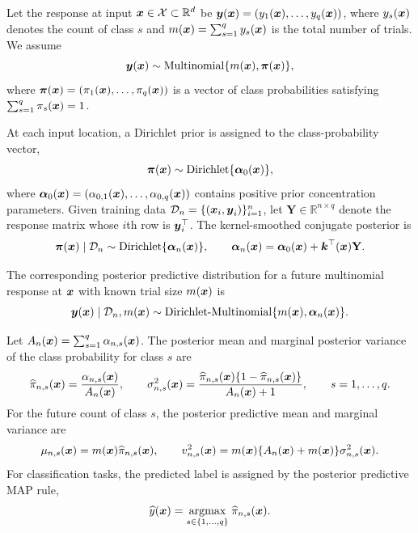 \documentclass[article, shortnames]{jss}
\renewcommand{\vec}[1]{\mbox{\boldmath ${#1}$}}
\def\argmax{\mbox{\rm argmax}}
\begin{document}
Let the response at input $\vec{x}\in\mathcal{X}\subset\mathbb{R}^d$ be 
$\vec{y}(\vec{x})=(y_1(\vec{x}),\ldots,y_q(\vec{x}))$, where $y_s(\vec{x})$ denotes the count of class $s$ and $m(\vec{x})=\sum_{s=1}^q y_s(\vec{x})$ is the total number of trials. 
We assume
\[
\vec{y}(\vec{x}) \sim \mathrm{Multinomial}\{m(\vec{x}),\vec{\pi}(\vec{x})\},
\]
where $\vec{\pi}(\vec{x})=(\pi_1(\vec{x}),\ldots,\pi_q(\vec{x}))$ is a vector of class probabilities satisfying $\sum_{s=1}^q\pi_s(\vec{x})=1$.

At each input location, a Dirichlet prior is assigned to the class-probability vector,
\[
\vec{\pi}(\vec{x})\sim\mathrm{Dirichlet}\{\vec{\alpha}_0(\vec{x})\},
\]
where $\vec{\alpha}_0(\vec{x})=(\alpha_{0,1}(\vec{x}),\ldots,\alpha_{0,q}(\vec{x}))$ contains positive prior concentration parameters. 
Given training data $\mathcal{D}_n=\{(\vec{x}_i,\vec{y}_i)\}_{i=1}^n$, let $\mathbf{Y}\in\mathbb{R}^{n\times q}$ denote the response matrix whose $i$th row is $\vec{y}_i^\top$. 
The kernel-smoothed conjugate posterior is
\begin{equation}\label{eq:DKP_model}
	\vec{\pi}(\vec{x}) \mid \mathcal{D}_n 
	\sim 
	\mathrm{Dirichlet}\{\vec{\alpha}_n(\vec{x})\},
	\qquad
	\vec{\alpha}_n(\vec{x}) 
	= \vec{\alpha}_0(\vec{x}) + \vec{k}^{\top}(\vec{x})\mathbf{Y}.
\end{equation}

The corresponding posterior predictive distribution for a future multinomial response at $\vec{x}$ with known trial size $m(\vec{x})$ is
\begin{equation}\label{eq:DKP_predictive_count}
	\vec{y}(\vec{x}) \mid \mathcal{D}_n, m(\vec{x})
	\sim
	\mathrm{Dirichlet\mbox{-}Multinomial}
	\{m(\vec{x}), \vec{\alpha}_n(\vec{x})\}.
\end{equation}

Let $A_n(\vec{x})=\sum_{s=1}^q\alpha_{n,s}(\vec{x})$. 
The posterior mean and marginal posterior variance of the class probability for class $s$ are
\[
\widehat{\pi}_{n,s}(\vec{x}) 
= \frac{\alpha_{n,s}(\vec{x})}{A_n(\vec{x})},
\qquad
\sigma^2_{n,s}(\vec{x}) 
= \frac{\widehat{\pi}_{n,s}(\vec{x})\{1-\widehat{\pi}_{n,s}(\vec{x})\}}
{A_n(\vec{x})+1},
\qquad s=1,\ldots,q.
\]
For the future count of class $s$, the posterior predictive mean and marginal variance are
\[
\mu_{n,s}(\vec{x}) 
= m(\vec{x})\widehat{\pi}_{n,s}(\vec{x}),
\qquad
v^2_{n,s}(\vec{x}) 
= m(\vec{x})\{A_n(\vec{x})+m(\vec{x})\}\sigma^2_{n,s}(\vec{x}).
\]
For classification tasks, the predicted label is assigned by the posterior predictive MAP rule,
\begin{equation}\label{eq:class_cri_DKP}
	\widehat{y}(\vec{x}) 
	= \underset{s\in\{1,\ldots,q\}}{\argmax}\; 
	\widehat{\pi}_{n,s}(\vec{x}).
\end{equation}
\end{document}
